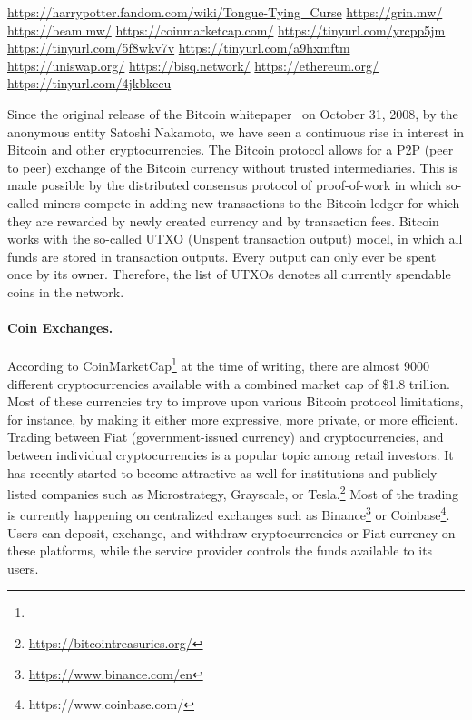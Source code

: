 \urldef\urlharrypotter\url{https://harrypotter.fandom.com/wiki/Tongue-Tying_Curse}
\urldef\urlgrin\url{https://grin.mw/}
\urldef\urlbeam\url{https://beam.mw/}
\urldef{\urlcoinmkt}\url{https://coinmarketcap.com/}
\urldef{\urlmtgox}\url{https://tinyurl.com/yrcpp5jm}
\urldef{\urlbitgrail}\url{https://tinyurl.com/5f8wkv7v}
\urldef{\urlquadriga}\url{https://tinyurl.com/a9hxmftm}
\urldef{\urluniswp}\url{https://uniswap.org/}
\urldef{\urlbisq}\url{https://bisq.network/}
\urldef{\urlethereum}\url{https://ethereum.org/}
\urldef{\urlgrinfund}\url{https://tinyurl.com/4jkbkccu}

Since the original release of the Bitcoin whitepaper~\cite{nakamoto2019bitcoin} on October 31, 2008, by the anonymous entity Satoshi Nakamoto, we have seen a continuous rise in interest in Bitcoin and other cryptocurrencies.
The Bitcoin protocol allows for a P2P (peer to peer) exchange of the Bitcoin currency without trusted intermediaries.
This is made possible by the distributed consensus protocol of proof-of-work in which so-called miners compete in adding new transactions to the Bitcoin ledger for which they are rewarded by newly created currency and by transaction fees.
Bitcoin works with the so-called UTXO (Unspent transaction output) model, in which all funds are stored in transaction outputs. Every output can only ever be spent once by its owner. Therefore, the list of UTXOs denotes all currently spendable coins in the network.

\paragraph{Coin Exchanges.} According to CoinMarketCap\footnote{\urlcoinmkt} at the time of writing, there are almost 9000 different cryptocurrencies available with a combined market cap of \$1.8 trillion.
Most of these currencies try to improve upon various Bitcoin protocol limitations, for instance, by making it either more expressive, more private, or more efficient.
Trading between Fiat (government-issued currency) and cryptocurrencies, and between individual cryptocurrencies is a popular topic among retail investors.
It has recently started to become attractive as well for institutions and publicly listed companies such as Microstrategy, Grayscale, or Tesla.\footnote{\url{https://bitcointreasuries.org/}}
Most of the trading is currently happening on centralized exchanges such as Binance\footnote{\url{https://www.binance.com/en}} or Coinbase\footnote{https://www.coinbase.com/}.
Users can deposit, exchange, and withdraw cryptocurrencies or Fiat currency on these platforms, while the service provider controls the funds available to its users.

